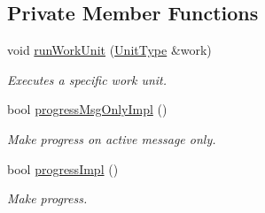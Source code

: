 \subsection*{Private Member Functions}
\begin{DoxyCompactItemize}
\item 
void \hyperlink{structvt_1_1sched_1_1_scheduler_ac4d5c3a4baf7a6cb6bdc2e8dc1a3af91}{run\+Work\+Unit} (\hyperlink{structvt_1_1sched_1_1_scheduler_a398229f29b0940cea85aba4bae78b0be}{Unit\+Type} \&work)
\begin{DoxyCompactList}\small\item\em Executes a specific work unit. \end{DoxyCompactList}\item 
bool \hyperlink{structvt_1_1sched_1_1_scheduler_adf3b895d57723f142ff413b3698fdf98}{progress\+Msg\+Only\+Impl} ()
\begin{DoxyCompactList}\small\item\em Make progress on active message only. \end{DoxyCompactList}\item 
bool \hyperlink{structvt_1_1sched_1_1_scheduler_a79ffccdc48af8073122f4de2d17e9d55}{progress\+Impl} ()
\begin{DoxyCompactList}\small\item\em Make progress. \end{DoxyCompactList}\end{DoxyCompactItemize}
